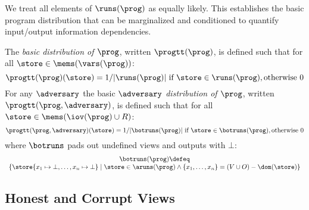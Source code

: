 We treat all elements of $\runs(\prog)$ as equally likely.  This
establishes the basic program distribution that can be marginalized
and conditioned to quantify input/output information dependencies.
\begin{definition}
  \label{def-progtt}
  \label{def-progd}
  \label{definition-progd}
  The \emph{basic distribution of $\prog$}, written $\progtt(\prog)$, is
  defined such that for all $\store \in \mems(\vars(\prog))$:
  $$
  \progtt(\prog)(\store) =  1 / |\runs(\prog)| \ \text{if}\ \store \in \runs(\prog), \text{otherwise}\ 0
  $$
  For any $\adversary$ the basic \emph{$\adversary$ distribution of $\prog$}, written
  $\progtt(\prog,\adversary)$, is
  defined such that for all $\store \in \mems(\iov(\prog) \cup R)$:
  $$
  \progtt(\prog,\adversary)(\store) =  1 / |\botruns(\prog)| \ \text{if}\ \store \in \botruns(\prog), \text{otherwise}\ 0
  $$
  where $\botruns$ pads out undefined views and outputs with $\bot$:
  $$
  \begin{array}{c}
    \botruns(\prog) \defeq \\
    \{ \store\{ x_1 \mapsto \bot, \ldots, x_n \mapsto \bot \} \mid 
    \store \in \aruns(\prog) \wedge \{ x_1,\ldots,x_n\} = (V \cup O) - \dom(\store) \}
  \end{array}
  $$
\end{definition}


\subsection{Honest and Corrupt Views}

